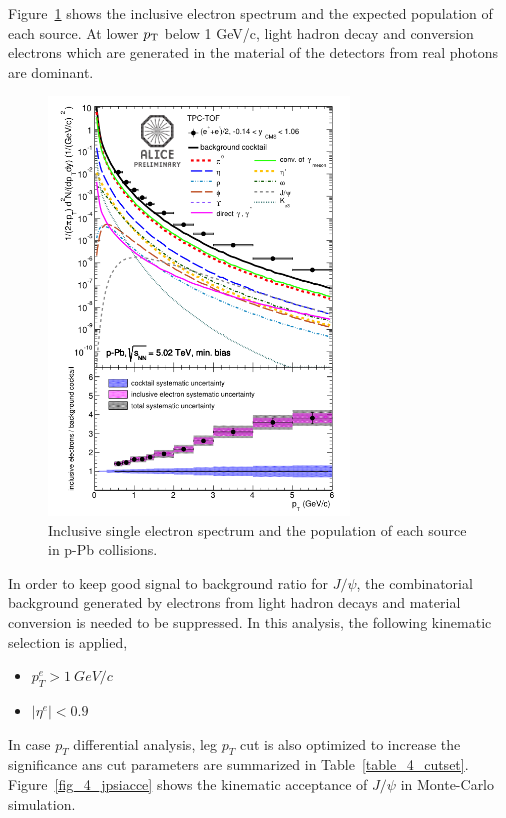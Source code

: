 Figure~\ref{fig_4_single} shows the inclusive electron spectrum and the expected population of each source. 
At lower $p_{\rm{T}}$ below 1 GeV/c, light hadron decay and conversion electrons which are generated in the material of the detectors from real photons are dominant. 
\begin{figure}[!h]
  \centering
  \includegraphics[width=8cm]{chap4/figure/Kinematics/single.png}
  \caption{Inclusive single electron spectrum and the population of each source in p-Pb collisions. }
  \label{fig_4_single}
\end{figure}
In order to keep good signal to background ratio for $J/\psi$, the combinatorial background generated by electrons from light hadron decays and material conversion is needed to be suppressed. 
In this analysis, the following kinematic selection is applied, 
\begin{itemize}
  \item $p^{e}_{T}>1~GeV/c$ 
  \item $|\eta^{e}|<0.9$
\end{itemize}
In case $p_{T}$ differential analysis, leg $p_{T}$ cut is also optimized to increase the significance ans cut parameters are summarized in Table~\ref{table_4_cutset}. 
Figure~\ref{fig_4_jpsiacce} shows the kinematic acceptance of $J/\psi$ in Monte-Carlo simulation. 

